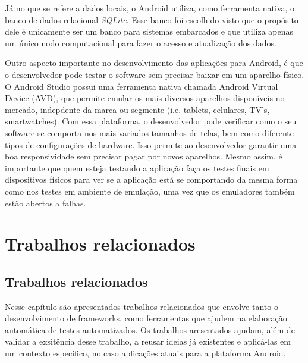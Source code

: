 \documentclass[
    12pt,       %
    openright,      %
    twoside,      %
    a4paper,      %
    english,      %
    french,       %
    spanish,      %
    brazil,       %
    ]{abntex2}
\begin{document}
        Já no que se refere a dados locais, o Android utiliza, como ferramenta nativa, o banco de
        dados relacional \textit{SQLite}. Esse banco foi escolhido visto que o propósito dele é
        unicamente ser um banco para sistemas embarcados e que utiliza apenas um único nodo
        computacional para fazer o acesso e atualização dos dados.

        Outro aspecto importante no desenvolvimento das aplicações para Android, é que o
        desenvolvedor pode testar o software sem precisar baixar em um aparelho
        físico. O Android Studio possui uma ferramenta nativa chamada Android Virtual
        Device (AVD), que permite emular os mais diversos aparelhos disponíveis no
        mercado, indepdente da marca ou segmente (i.e. tablets, celulares, TV's,
        smartwatches). Com essa plataforma, o desenvolvedor pode verificar como o seu
        software se comporta nos mais variados tamanhos de telas, bem como diferente
        tipos de configurações de hardware. Isso permite ao desenvolvedor garantir
        uma boa responsividade sem precisar pagar por novos aparelhos. Mesmo assim,
        é importante que quem esteja testando a aplicação faça os testes finais em
        dispositivos físicos para ver se a aplicação está se comportando da mesma
        forma como nos testes em ambiente de emulação, uma vez que os emuladores
        também estão abertos a falhas.

  \part{Trabalhos relacionados}

  \chapter{Trabalhos relacionados}
    Nesse capítulo são apresentados trabalhos relacionados que envolve tanto o desenvolvimento de frameworks,
    como ferramentas que ajudem na elaboração automática de testes automatizados. Os trabalhos aresentados
    ajudam, além de validar a exsitência desse trabalho, a reusar ideias já existentes e aplicá-las em um
    contexto específico, no caso aplicações atuais para a plataforma Android.
\end{document}
